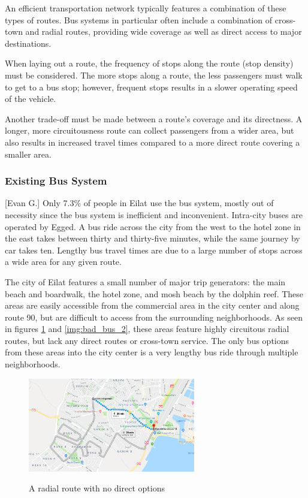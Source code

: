 \documentclass[12pt]{article}                               %
\begin{document}
An efficient transportation network typically features a combination of these types of routes. Bus systems in particular often include a combination of cross-town and radial routes, providing wide coverage as well as direct access to major destinations.

When laying out a route, the frequency of stops along the route (stop density) must be considered. The more stops along a route, the less passengers must walk to get to a bus stop; however, frequent stops results in a slower operating speed of the vehicle.

Another trade-off must be made between a route's coverage and its directness. A longer, more circuitousness route can collect passengers from a wider area, but also results in increased travel times compared to a more direct route covering a smaller area.

\subsubsection{Existing Bus System}[Evan G.]
Only 7.3\% of people in Eilat use the bus system, mostly out of necessity since the bus system is inefficient and inconvenient. Intra-city buses are operated by Egged. A bus ride across the city from the west to the hotel zone in the east takes between thirty and thirty-five minutes, while the same journey by car takes ten. Lengthy bus travel times are due to a large number of stops across a wide area for any given route.

The city of Eilat features a small number of major trip generators: the main beach and boardwalk, the hotel zone, and mosh beach by the dolphin reef. These areas are easily accessible from the commercial area in the city center and along route 90, but are difficult to access from the surrounding neighborhoods. As seen in figures \ref{img:bad_bus_1} and \ref{img:bad_bus_2}, these areas feature highly circuitous radial routes, but lack any direct routes or cross-town service. The only bus options from these areas into the city center is a very lengthy bus ride through multiple neighborhoods.

\begin{figure}[H]
    \centering
    \href{https://www.google.com/maps/dir/29.5578131,34.9388748/29.5512465,34.9536416/@29.5539541,34.9429944,15.12z/data=!4m2!4m1!3e3}{\includegraphics[width=0.65\textwidth]{images/bad_bus_1.png}}
    \caption{A radial route with no direct options}
    \label{img:bad_bus_1}
\end{figure}
\end{document}
